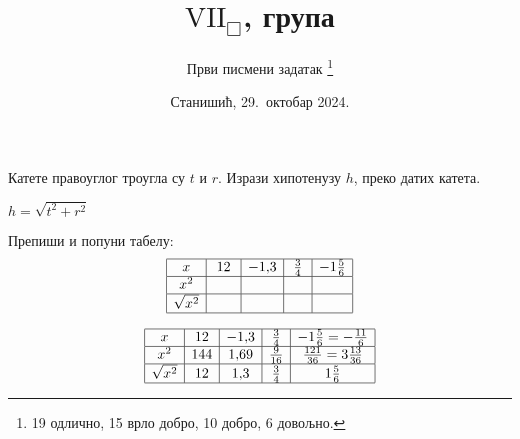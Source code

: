 \documentclass[12pt,a5paper,addpoints]{exam}
\title{$\mathrm{VII}_\Box$, група \grupa 1234}
\author{Први писмени задатак
 \thanks{
  19 одлично,
  15 врло добро,
  10 добро,
   6 довољно.
 }
}
\date{Станишић, 29.\ октобар 2024.}
\def\grupa#1#2#3#4{#1}
\begin{document}
\maketitle
\thispagestyle{headandfoot}

\noindent \gradetable[h]

\begin{questions}

\question[1] %
 Катете правоуглог троугла су $\grupa tshv$ и $\grupa rdts$.
 Изрази хипотенузу $\grupa hvrd$, преко датих катета.
 \begin{solution}
  $
   \grupa
    {h = \sqrt{t^2 + r^2}}
    {v = \sqrt{s^2 + d^2}}
    {r = \sqrt{h^2 + t^2}}
    {d = \sqrt{v^2 + s^2}}
  $
 \end{solution}

\question[4] %
 Препиши и попуни табелу:
 $$
  \begin{array}{|*5{c|}} \hline
   x & \grupa
    {12 & -1,\!3 & \frac 34 & -1 \frac 56}
    {11 & -1,\!4 & \frac 35 & -2 \frac 23}
    {14 & -1,\!1 & \frac 56 & -1 \frac 34}
    {13 & -1,\!2 & \frac 25 & -3 \frac 12}
   \\\hline
   x^2 & \phantom{121} & \phantom{1,\!44} & \phantom{\frac 4{25}} & \phantom{5 \frac 49} \\\hline
   \sqrt{x^2} & & & & \\\hline
  \end{array}
 $$
 \begin{solution}
 $$
  \begin{array}{|*5{c|}} \hline
   x & \grupa
    {12 & -1,\!3 & \frac 34 & -1 \frac 56 = - \frac{11}6}
    {11 & -1,\!4 & \frac 35 & -2 \frac 23 = - \frac 83}
    {14 & -1,\!1 & \frac 56 & -1 \frac 34 = - \frac 74}
    {13 & -1,\!2 & \frac 25 & -3 \frac 12 = - \frac 72}
   \\\hline
   x^2 & \grupa
    {144 & 1,\!69 & \frac 9{16} & \frac{121}{36} = 3 \frac{13}{36}}
    {121 & 1,\!96 & \frac 9{25} & \frac{64}9 = 7 \frac 19}
    {196 & 1,\!21 & \frac{25}{36} & \frac{49}{16} = 3 \frac 1{16}}
    {169 & 1,\!44 & \frac 4{25} & \frac{49}4 = 12 \frac 14}
   \\\hline
   \sqrt{x^2} & \grupa
    {12 & 1,\!3 & \frac 34 & 1 \frac 56}
    {11 & 1,\!4 & \frac 35 & 2 \frac 23}
    {14 & 1,\!1 & \frac 56 & 1 \frac 34}
    {13 & 1,\!2 & \frac 25 & 3 \frac 12}
   \\\hline
  \end{array}
 $$
 \end{solution}


\end{questions}
\end{document}

